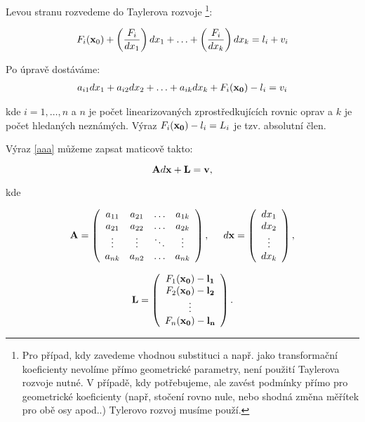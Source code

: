 Levou stranu rozvedeme do Taylerova rozvoje \footnote[1]{
Pro případ, kdy zavedeme vhodnou substituci a např. jako transformační
koeficienty nevolíme přímo geometrické parametry, není použití Taylerova 
rozvoje nutné. V případě, kdy potřebujeme, ale zavést podmínky přímo pro
geometrické koeficienty (např, stočení rovno nule,  nebo shodná změna měřítek
pro obě osy apod..) Tylerovo rozvoj musíme použí.}:

$$F_i ({\bf x}_0) +  \left(\frac{F_i}{dx_1}\right)dx_1 +\ldots+\left(\frac{F_i
}{dx_k}\right)dx_k = l_i + v_i$$

Po úpravě dostáváme:
\begin{eqnarray} \label{aaa}
 a_{i1} dx_1 + a_{i2} dx_2 + \ldots + a_{ik} dx_k + F_i ({\bf x_0})-l_i = v_i
\end{eqnarray}

kde $i = 1, \ldots ,n$ a  $n$ je počet linearizovaných zprostředkujících rovnic
oprav a $k$ je počet hledaných neznámých. Výraz $ F_i ( {\bf x_0} )-l_i= L_i$ je
tzv. absolutní člen.

Výraz \ref{aaa} můžeme zapsat maticově takto:

$${\bf A} d {\bf x} + {\bf L} = {\bf v}, $$

kde

\begin{eqnarray} {\bf A} = \left(
\begin{array}{cccc }
a_{11}  &   a_{21}  & \ldots  & a_{1k}  \\
a_{21}  &   a_{22}  & \ldots  &a_{2k} \\
\vdots  &   \vdots  & \ddots  & \vdots \\
a_{nk} &    a_{n2}  & \ldots  &a_{nk}                                
\end{array}
 \right), 
\hspace{0.5cm}
d \bf x =
\left(
\begin{array}{c }
 dx_1 \\
 dx_2\\
 \vdots\\
 dx_k                        
\end{array}
 \right), 
\end{eqnarray} 

\begin{eqnarray} 
 \label{L}
\bf L =
\left(
\begin{array}{c }
 F_1 (\bf x_0) - l_1 \\
 F_2 (\bf x_0) - l_2 \\
 \vdots\\
 F_n (\bf x_0) - l_n \\                   
\end{array}
 \right).
\end{eqnarray}

